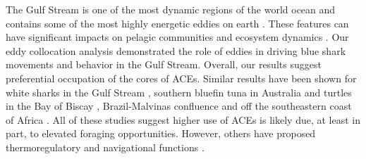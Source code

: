 The Gulf Stream is one of the most dynamic regions of the world ocean and contains some of the most highly energetic eddies on earth \citep{Chelton2011}. These features can have significant impacts on pelagic communities \citep{Gaube2017DSR} and ecosystem dynamics \citep{Davis1985, Boyd1986, Gaube2018}. Our eddy collocation analysis demonstrated the role of eddies in driving blue shark movements and behavior in the Gulf Stream. Overall, our results suggest preferential occupation of the cores of ACEs. Similar results have been shown for white sharks in the Gulf Stream \citep{Gaube2018}, southern bluefin tuna in Australia \citep{Hobday2014} and turtles in the Bay of Biscay \citep{Doyle2008}, Brazil-Malvinas confluence \citep{Gaube2017} and off the southeastern coast of Africa \citep{Luschi2003}. All of these studies suggest higher use of ACEs is likely due, at least in part, to elevated foraging opportunities. However, others have proposed thermoregulatory \citep{Campana2011, Gaube2018, Gaube2017} and navigational functions \citep{Carey1990}.

